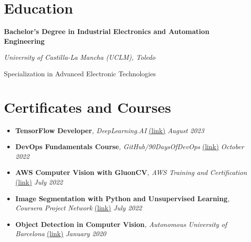 \documentclass[11pt]{article}
\begin{document}
\section*{Education}
\noindent \textbf{ Bachelor's Degree in Industrial Electronics and Automation Engineering }

\noindent \textit{ University of Castilla-La Mancha (UCLM), Toledo }

\noindent Specialization in Advanced Electronic Technologies

\vspace{0.05cm}

\section*{Certificates and Courses}
\begin{itemize}[leftmargin=0em, itemsep=0.01em, parsep=0em]
  
  \item[]
    \footnotesize{\textbf{TensorFlow Developer}\textit{, DeepLearning.AI} \href{https://coursera.org/share/91c8ac7e282d5da95e8e7dec5380e729}{(link)} \hfill \textit{August 2023}}
  
  \item[]
    \footnotesize{\textbf{DevOps Fundamentals Course}\textit{, GitHub/90DaysOfDevOps} \href{https://github.com/MichaelCade/90DaysOfDevOps}{(link)} \hfill \textit{October 2022}}
  
  \item[]
    \footnotesize{\textbf{AWS Computer Vision with GluonCV}\textit{, AWS Training and Certification} \href{https://drive.google.com/file/d/1tZ_E_sO1n-Pi9VzA1FJZbX-ktANQeggb/view?usp=sharing}{(link)} \hfill \textit{July 2022}}
  
  \item[]
    \footnotesize{\textbf{Image Segmentation with Python and Unsupervised Learning}\textit{, Coursera Project Network} \href{https://coursera.org/share/508c202fdb8d817cfeeb455026dc27e3}{(link)} \hfill \textit{July 2022}}
  
  \item[]
    \footnotesize{\textbf{Object Detection in Computer Vision}\textit{, Autonomous University of Barcelona} \href{https://www.coursera.org/account/accomplishments/verify/BWNJFRKDSHQM?utm_campaign=copybutton_certificate&utm_medium=certificate&utm_source=link}{(link)} \hfill \textit{January 2020}}
  
\end{itemize}
\end{document}
